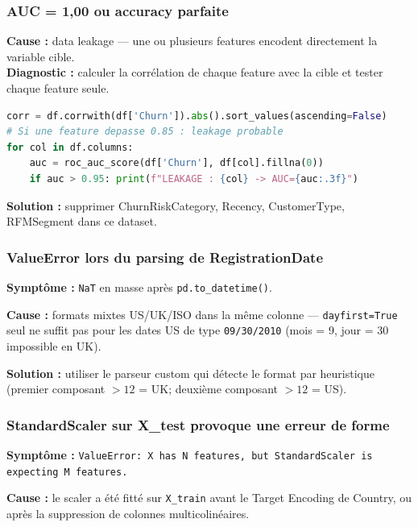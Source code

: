 \documentclass[11pt,a4paper]{article}
\begin{document}
\subsubsection{AUC = 1,00 ou accuracy parfaite}

\begin{tcolorbox}[title=Symptôme : performance parfaite en entraînement, colframe=warningred, colback=lightred, colbacktitle=warningred]
\textbf{Cause :} data leakage — une ou plusieurs features encodent directement la variable cible.\\[4pt]
\textbf{Diagnostic :} calculer la corrélation de chaque feature avec la cible et tester chaque feature seule.
\begin{lstlisting}[language=Python, numbers=none]
corr = df.corrwith(df['Churn']).abs().sort_values(ascending=False)
# Si une feature depasse 0.85 : leakage probable
for col in df.columns:
    auc = roc_auc_score(df['Churn'], df[col].fillna(0))
    if auc > 0.95: print(f"LEAKAGE : {col} -> AUC={auc:.3f}")
\end{lstlisting}
\textbf{Solution :} supprimer ChurnRiskCategory, Recency, CustomerType, RFMSegment dans ce dataset.
\end{tcolorbox}

\subsubsection{ValueError lors du parsing de RegistrationDate}

\textbf{Symptôme :} \texttt{NaT} en masse après \texttt{pd.to\_datetime()}.

\textbf{Cause :} formats mixtes US/UK/ISO dans la même colonne — \texttt{dayfirst=True} seul ne suffit pas pour les dates US de type \texttt{09/30/2010} (mois = 9, jour = 30 impossible en UK).

\textbf{Solution :} utiliser le parseur custom qui détecte le format par heuristique (premier composant $> 12$ = UK; deuxième composant $> 12$ = US).

\subsubsection{StandardScaler sur X\_test provoque une erreur de forme}

\textbf{Symptôme :} \texttt{ValueError: X has N features, but StandardScaler is expecting M features.}

\textbf{Cause :} le scaler a été fitté sur \texttt{X\_train} avant le Target Encoding de Country, ou après la suppression de colonnes multicolinéaires.
\end{document}

